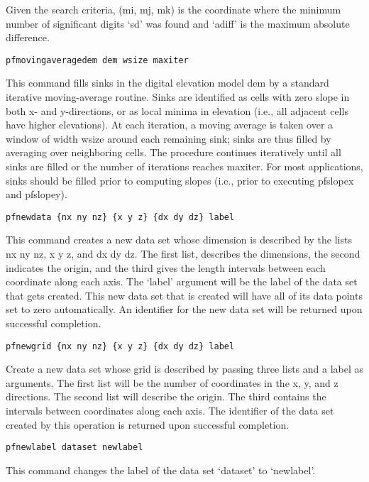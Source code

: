 \begin{description}
Given the search criteria, (mi, mj, mk) is the coordinate where the
minimum number of significant digits `sd' was found and `adiff' is
the maximum absolute difference.


\item{\begin{verbatim}pfmovingaveragedem dem wsize maxiter \end{verbatim}}
This command fills sinks in the digital elevation model dem by a standard iterative
moving-average routine. Sinks are identified as cells with zero slope in both x- and
y-directions, or as local minima in elevation (i.e., all adjacent cells have higher
elevations). At each iteration, a moving average is taken over a window of width
wsize around each remaining sink; sinks are thus filled by averaging over neighboring
cells. The procedure continues iteratively until all sinks are filled or the number
of iterations reaches maxiter. For most applications, sinks should be filled prior
to computing slopes (i.e., prior to executing pfslopex and pfslopey).


\item{\begin{verbatim}pfnewdata {nx ny nz} {x y z} {dx dy dz} label\end{verbatim}}
This command creates a new data set whose dimension is described by
the lists {nx ny nz}, {x y z}, and {dx dy dz}.  The first list,
describes the dimensions, the second indicates the origin, and the
third gives the length intervals between each coordinate along each
axis.  The `label' argument will be the label of the data set that
gets created.  This new data set that is created will have all of
its data points set to zero automatically.  An identifier for the new
data set will be returned upon successful completion.


\item{\begin{verbatim}pfnewgrid {nx ny nz} {x y z} {dx dy dz} label\end{verbatim}}
Create a new data set whose grid is described by passing three lists and a label as arguments.
The first list will be the number of coordinates in the x, y, and z directions.
The second list will describe the origin. The third contains the intervals between coordinates along each axis.
The identifier of the data set created by this operation is returned upon successful completion.

\item{\begin{verbatim}pfnewlabel dataset newlabel\end{verbatim}}
This command changes the label of the data set `dataset' to
`newlabel'.



\end{description}
